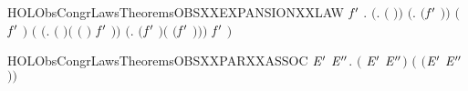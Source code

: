 \newcommand{\HOLObsCongrLawsDate}{21 June 2020}
\newcommand{\HOLObsCongrLawsTime}{18:11}
\begin{SaveVerbatim}{HOLObsCongrLawsTheoremsOBSXXEXPANSIONXXLAW}
\HOLTokenTurnstile{} \HOLSymConst{\HOLTokenForall{}}  \ensuremath{\HOLBoundVar{f}\sp{\prime}} .
       \ensuremath{(}\HOLSymConst{\HOLTokenForall{}}.  \HOLSymConst{\HOLTokenLeq{}}  \HOLSymConst{\HOLTokenImp{}}  \ensuremath{(} \ensuremath{)}\ensuremath{)} \HOLSymConst{\HOLTokenConj{}}
       \ensuremath{(}\HOLSymConst{\HOLTokenForall{}}.  \HOLSymConst{\HOLTokenLeq{}}  \HOLSymConst{\HOLTokenImp{}}  \ensuremath{(}\ensuremath{\HOLBoundVar{f}\sp{\prime}} \ensuremath{)}\ensuremath{)} \HOLSymConst{\HOLTokenImp{}}
        \ensuremath{(}\HOLConst{\HOLTokenSum{}}   \HOLSymConst{\ensuremath{\mid}} \HOLConst{\HOLTokenSum{}} \ensuremath{\HOLBoundVar{f}\sp{\prime}} \ensuremath{)}
         \ensuremath{(}\HOLConst{\HOLTokenSum{}} \ensuremath{(}\HOLTokenLambda{}.  \ensuremath{(} \ensuremath{)}\HOLSymConst{\ensuremath{\ldotp}}\ensuremath{(} \ensuremath{(} \ensuremath{)} \HOLSymConst{\ensuremath{\mid}} \HOLConst{\HOLTokenSum{}} \ensuremath{\HOLBoundVar{f}\sp{\prime}} \ensuremath{)}\ensuremath{)}  \HOLSymConst{\ensuremath{+}}
          \HOLConst{\HOLTokenSum{}} \ensuremath{(}\HOLTokenLambda{}.  \ensuremath{(}\ensuremath{\HOLBoundVar{f}\sp{\prime}} \ensuremath{)}\HOLSymConst{\ensuremath{\ldotp}}\ensuremath{(}\HOLConst{\HOLTokenSum{}}   \HOLSymConst{\ensuremath{\mid}}  \ensuremath{(}\ensuremath{\HOLBoundVar{f}\sp{\prime}} \ensuremath{)}\ensuremath{)}\ensuremath{)}  \HOLSymConst{\ensuremath{+}}
             \ensuremath{\HOLBoundVar{f}\sp{\prime}} \ensuremath{)}
\end{SaveVerbatim}
\newcommand{\HOLObsCongrLawsTheoremsOBSXXEXPANSIONXXLAW}{\UseVerbatim{HOLObsCongrLawsTheoremsOBSXXEXPANSIONXXLAW}}
\begin{SaveVerbatim}{HOLObsCongrLawsTheoremsOBSXXPARXXASSOC}
\HOLTokenTurnstile{} \HOLSymConst{\HOLTokenForall{}} \ensuremath{\HOLBoundVar{E}\sp{\prime}} \ensuremath{\HOLBoundVar{E}\sp{\prime\prime}}.  \ensuremath{(} \HOLSymConst{\ensuremath{\mid}} \ensuremath{\HOLBoundVar{E}\sp{\prime}} \HOLSymConst{\ensuremath{\mid}} \ensuremath{\HOLBoundVar{E}\sp{\prime\prime}}\ensuremath{)} \ensuremath{(} \HOLSymConst{\ensuremath{\mid}} \ensuremath{(}\ensuremath{\HOLBoundVar{E}\sp{\prime}} \HOLSymConst{\ensuremath{\mid}} \ensuremath{\HOLBoundVar{E}\sp{\prime\prime}}\ensuremath{)}\ensuremath{)}
\end{SaveVerbatim}
